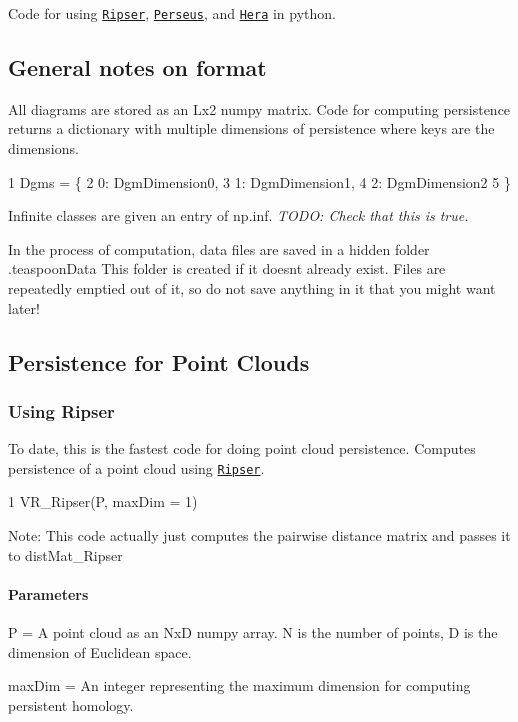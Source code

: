 Code for using \href{https://github.com/Ripser/ripser}{\tt Ripser}, \href{http://people.maths.ox.ac.uk/nanda/perseus/index.html}{\tt Perseus}, and \href{https://bitbucket.org/grey_narn/hera}{\tt Hera} in python.

\subsection*{General notes on format}

All diagrams are stored as an Lx2 numpy matrix. Code for computing persistence returns a dictionary with multiple dimensions of persistence where keys are the dimensions. 
\begin{DoxyCode}
1 Dgms = \{
2     0: DgmDimension0,
3     1: DgmDimension1,
4     2: DgmDimension2
5 \}
\end{DoxyCode}
 Infinite classes are given an entry of np.\+inf. {\itshape T\+O\+DO\+: Check that this is true.}

In the process of computation, data files are saved in a hidden folder .teaspoon\+Data This folder is created if it doesn\textquotesingle{}t already exist. Files are repeatedly emptied out of it, so do not save anything in it that you might want later! 



\subsection*{Persistence for Point Clouds}

\subsubsection*{Using Ripser}

To date, this is the fastest code for doing point cloud persistence. Computes persistence of a point cloud using \href{https://github.com/Ripser/ripser}{\tt Ripser}.


\begin{DoxyCode}
1 VR\_Ripser(P, maxDim = 1)
\end{DoxyCode}


Note\+: This code actually just computes the pairwise distance matrix and passes it to dist\+Mat\+\_\+\+Ripser

\paragraph*{Parameters}


\begin{DoxyItemize}
\item P = A point cloud as an NxD numpy array. N is the number of points, D is the dimension of Euclidean space.
\item max\+Dim = An integer representing the maximum dimension for computing persistent homology.
\end{DoxyItemize}

